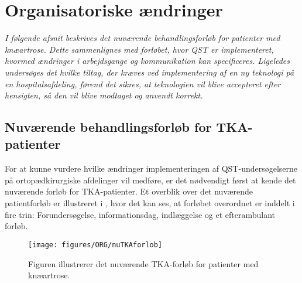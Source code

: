 \section{Organisatoriske ændringer}
\textit{I følgende afsnit beskrives det nuværende behandlingsforløb for patienter med knæartrose. Dette sammenlignes med forløbet, hvor QST er implementeret, hvormed ændringer i arbejdsgange og kommunikation kan specificeres. Ligeledes undersøges det hvilke tiltag, der kræves ved implementering af en ny teknologi på en hospitalsafdeling, førend det sikres, at teknologien vil blive accepteret efter hensigten, så den vil blive modtaget og anvendt korrekt.}


\subsection{Nuværende behandlingsforløb for TKA-patienter}
For at kunne vurdere hvilke ændringer implementeringen af QST-undersøgelserne på ortopædkirurgiske afdelinger vil medføre, er det nødvendigt først at kende det nuværende forløb for TKA-patienter. Et overblik over det nuværende patientforløb er illustreret i , hvor det kan ses, at forløbet overordnet er inddelt i fire trin: Forundersøgelse, informationsdag, indlæggelse og et efterambulant forløb. 


\begin{figure}[H] 
	\begin{center}
		\texttt{[image: figures/ORG/nuTKAforlob]}
	\end{center}
	\caption{Figuren illustrerer det nuværende TKA-forløb for patienter med knæartrose.} 
	\label{nuTKAforlob} 
\end{figure} \vspace{-.25cm}


